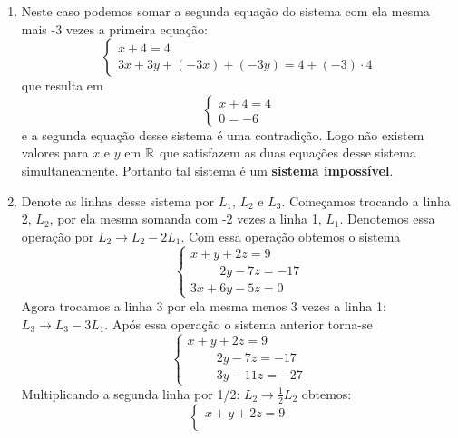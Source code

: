 \begin{exemplos}
	\begin{solucao}
		\begin{enumerate}
			\item Neste caso podemos somar a segunda equação do sistema com ela mesma mais -3 vezes a primeira equação:
				\[
					\begin{cases}
						x + 4 = 4\\
						3x + 3y + (-3x) + (-3y) = 4 + (-3)\cdot 4
					\end{cases}
				\]
			que resulta em
			\[
				\begin{cases}
					x + 4 = 4\\
					0 = -6
				\end{cases}
			\]
			e a segunda equação desse sistema é uma contradição. Logo não existem valores para $x$ e $y$ em $\mathbb{R}$ que satisfazem as duas equações desse sistema simultaneamente. Portanto tal sistema é um \textbf{sistema impossível}.
                    \item Denote as linhas desse sistema por $L_1$, $L_2$ e $L_3$. Começamos trocando a linha 2, $L_2$, por ela mesma somanda com -2 vezes a linha 1, $L_1$. Denotemos essa operação por $L_2 \to L_2 - 2L_1$. Com essa operação obtemos o sistema
                        \[
                            \begin{cases}
                                x + y + 2z = 9\\
                                \phantom{2x +} 2y - 7z = -17\\
                                3x + 6y - 5z = 0
                            \end{cases}
                        \]
                        Agora trocamos a linha 3 por ela mesma menos 3 vezes a linha 1: $L_3 \to L_3 - 3L_1$. Após essa operação o sistema anterior torna-se
                        \[
                            \begin{cases}
                                x + y + 2z = 9\\
                                \phantom{2x +} 2y - 7z = -17\\
                                \phantom{3x +} 3y - 11z = -27
                            \end{cases}
                        \]
                        Multiplicando a segunda linha por 1/2: $L_2 \to \frac{1}{2}L_2$ obtemos:
                        \[
                            \begin{cases}
                                x + y + 2z = 9\\

\end{cases}\]
\end{enumerate}
\end{solucao}
\end{exemplos}
